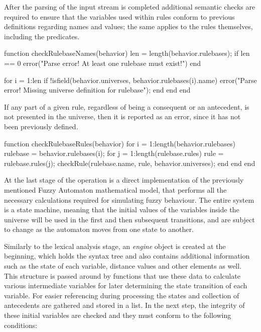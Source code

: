 After the parsing of the input stream is completed additional semantic checks are required to ensure that the variables used within rules conform to previous definitions regarding names and values; the same applies to the rules themselves, including the predicates.

\begin{octave}
function checkRulebaseNames(behavior)
  len = length(behavior.rulebases);
  if len == 0
    error("Parse error! At least one rulebase must exist!\n")
  end

  for i = 1:len
    if !isfield(behavior.universes, behavior.rulebases(i).name)
      error("Parse error! Missing universe definition for rulebase\n");
    end
  end
end
\end{octave}

If any part of a given rule, regardless of being a consequent or an antecedent, is not presented in the universe, then it is reported as an error, since it has not been previously defined.
\begin{octave}
function checkRulebaseRules(behavior)
  for i = 1:length(behavior.rulebases)
    rulebase = behavior.rulebases(i);
    for j = 1:length(rulebase.rules)
      rule = rulebase.rules(j);
      checkRule(rulebase.name, rule, behavior.universes);
    end
  end
end
\end{octave}

At the last stage of the operation is a direct implementation of the previously mentioned Fuzzy Automaton mathematical model, that performs all the necessary calculations required for simulating fuzzy behaviour. The entire system is a state machine, meaning that the initial values of the variables inside the universe will be used in the first and then subsequent transitions, and are subject to change as the automaton moves from one state to another.

Similarly to the lexical analysis stage, an \textit{engine} object is created at the beginning, which holds the syntax tree and also contains additional information such as the state of each variable, distance values and other elements as well. This structure is passed around by functions that use these data to calculate various intermediate variables for later determining the state transition of each variable. For easier referencing during processing the states and collection of antecedents are gathered and stored in a list. In the next step, the integrity of these initial variables are checked and they must conform to the following conditions:

